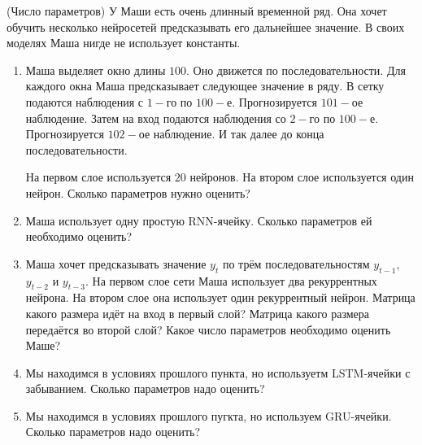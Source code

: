 \begin{problem}{(Число параметров)}
У Маши есть очень длинный временной ряд. Она хочет обучить несколько нейросетей предсказывать его дальнейшее значение. В своих моделях Маша нигде не использует константы. 

\begin{enumerate} 
    \item Маша выделяет окно длины $100$. Оно движется по последовательности. Для каждого окна Маша предсказывает следующее значение в ряду. В сетку подаются наблюдения с $1-$го по $100-$е. Прогнозируется $101-$ое наблюдение. Затем на вход подаются наблюдения со $2-$го по $100-$е. Прогнозируется $102-$ое наблюдение. И так далее до конца последовательности.
    
    На первом слое используется $20$ нейронов. На втором слое используется один нейрон. Сколько параметров нужно оценить? 
    
    \item Маша использует одну простую RNN-ячейку. Сколько параметров ей необходимо оценить? 
    
    \item Маша хочет предсказывать значение $y_t$ по трём последовательностям $y_{t-1},$ $y_{t-2}$ и $y_{t-3}.$ На первом слое сети Маша использует два рекуррентных нейрона. На втором слое она использует один рекуррентный нейрон. Матрица какого размера идёт на вход в первый слой? Матрица какого размера передаётся во второй слой? Какое число параметров необходимо оценить Маше? 
    
    \item Мы находимся в условиях прошлого пункта, но используетм LSTM-ячейки с забыванием. Сколько параметров надо оценить? 
    
    \item Мы находимся в условиях прошлого пугкта, но используем GRU-ячейки. Сколько параметров надо оценить?
\end{enumerate} 
\end{problem}


